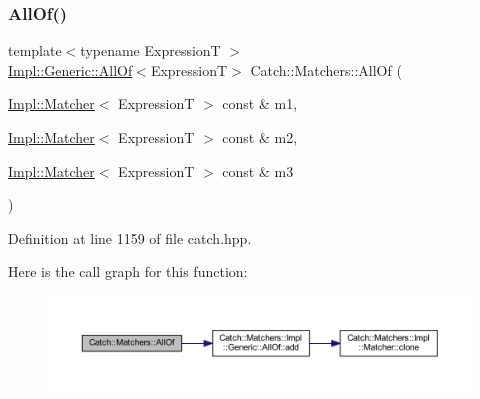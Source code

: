 \subsubsection{\texorpdfstring{All\+Of()}{AllOf()}\hspace{0.1cm}{\footnotesize\ttfamily [2/2]}}
{\footnotesize\ttfamily template$<$typename ExpressionT $>$ \\
\hyperlink{class_catch_1_1_matchers_1_1_impl_1_1_generic_1_1_all_of}{Impl\+::\+Generic\+::\+All\+Of}$<$ExpressionT$>$ Catch\+::\+Matchers\+::\+All\+Of (\begin{DoxyParamCaption}\item[{\hyperlink{struct_catch_1_1_matchers_1_1_impl_1_1_matcher}{Impl\+::\+Matcher}$<$ ExpressionT $>$ const \&}]{m1,  }\item[{\hyperlink{struct_catch_1_1_matchers_1_1_impl_1_1_matcher}{Impl\+::\+Matcher}$<$ ExpressionT $>$ const \&}]{m2,  }\item[{\hyperlink{struct_catch_1_1_matchers_1_1_impl_1_1_matcher}{Impl\+::\+Matcher}$<$ ExpressionT $>$ const \&}]{m3 }\end{DoxyParamCaption})\hspace{0.3cm}{\ttfamily [inline]}}



Definition at line 1159 of file catch.\+hpp.

Here is the call graph for this function\+:\nopagebreak
\begin{figure}[H]
\begin{center}
\leavevmode
\includegraphics[width=350pt]{namespace_catch_1_1_matchers_a990366f7d62d10d9752ad7b24230def0_cgraph}
\end{center}
\end{figure}
\hypertarget{namespace_catch_1_1_matchers_a9cb139c71b9e391d5fc017764695bf84}{}\label{namespace_catch_1_1_matchers_a9cb139c71b9e391d5fc017764695bf84} 
